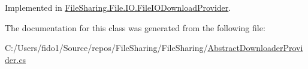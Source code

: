 Implemented in \hyperlink{class_file_sharing_1_1_file_1_1_i_o_1_1_file_i_o_download_provider_a20619028413c369ac0cc064b610d5c0e}{File\+Sharing.\+File.\+I\+O.\+File\+I\+O\+Download\+Provider}.



The documentation for this class was generated from the following file\+:\begin{DoxyCompactItemize}
\item 
C\+:/\+Users/fido1/\+Source/repos/\+File\+Sharing/\+File\+Sharing/\hyperlink{_abstract_downloader_provider_8cs}{Abstract\+Downloader\+Provider.\+cs}\end{DoxyCompactItemize}
